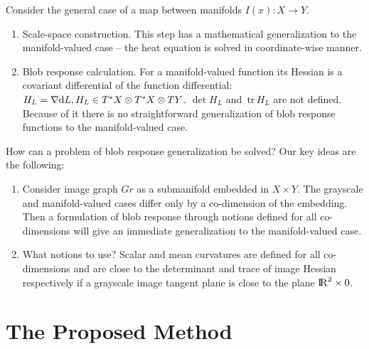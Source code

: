 \documentclass{llncs}
\newcommand{\CovariantDiff}{\nabla}
\newcommand{\Diff}{\mathrm{d}}
\newcommand{\TangentBundle}[1]{T{#1}}
\newcommand{\CotangentBundle}[1]{\tensor*{T}{^{*}}{#1}}
\newcommand {\tr}{{\,}\mathrm{tr}{\,}}
\begin{document}
Consider the general case of a map between manifolds $I(x):X \to Y$. 
\begin{enumerate}
\item Scale-space construction. This step has a mathematical generalization to the manifold-valued case -- the heat equation is solved in coordinate-wise manner.
\item Blob response calculation. For a manifold-valued function its Hessian is a covariant differential of the function differential: $H_L=\CovariantDiff \Diff L,H_L \in \CotangentBundle{X}\otimes\CotangentBundle{X}\otimes\TangentBundle{Y}$. $\det H_L$ and $\tr{H_L}$ are not defined. Because of it there is no straightforward generalization of blob response functions to the manifold-valued case. 
\end{enumerate}

How can a problem of blob response generalization be solved? Our key ideas are the following:
\begin{enumerate}
\item	Consider image graph $Gr$ as a submanifold embedded in $X\times Y$. The grayscale and manifold-valued cases differ only by a co-dimension of the embedding. Then a formulation of blob response through notions defined for all co-dimensions will give an immediate generalization to the manifold-valued case. 
\item	What notions to use? Scalar and mean curvatures are defined for all co-dimensions and are close to the determinant and trace of image Hessian respectively if a grayscale image tangent plane is close to the plane ${\rm I\!R}^2\times 0$.
\end{enumerate}

\section{The Proposed Method}
\end{document}
